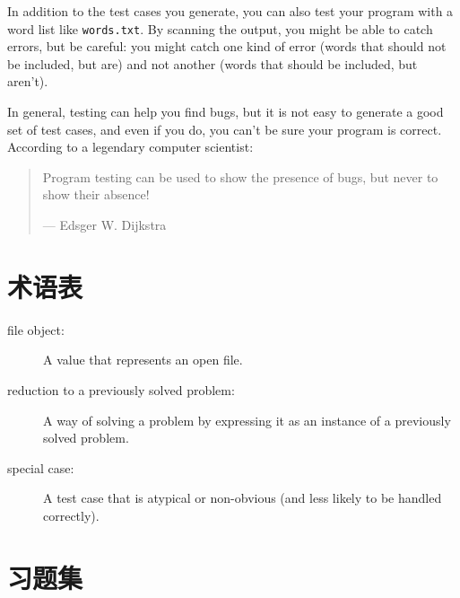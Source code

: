 \documentclass[10pt]{book}
\begin{document}
In addition to the test cases you generate, you can also test
your program with a word list like {\tt words.txt}.  By scanning
the output, you might be able to catch errors, but be careful:
you might catch one kind of error (words that should not be
included, but are) and not another (words that should be included,
but aren't).

In general, testing can help you find bugs, but it is not easy to
generate a good set of test cases, and even if you do, you can't
be sure your program is correct.
According to a legendary computer scientist:

\begin{quote}
Program testing can be used to show the presence of bugs, but never to
show their absence!

--- Edsger W. Dijkstra
\end{quote}


\section{术语表}

\begin{description}

\item[file object:] A value that represents an open file.

\item[reduction to a previously solved problem:] A way of solving a
  problem by expressing it as an instance of a previously solved
  problem.  

\item[special case:] A test case that is atypical or non-obvious
(and less likely to be handled correctly).

\end{description}


\section{习题集}
\end{document}
